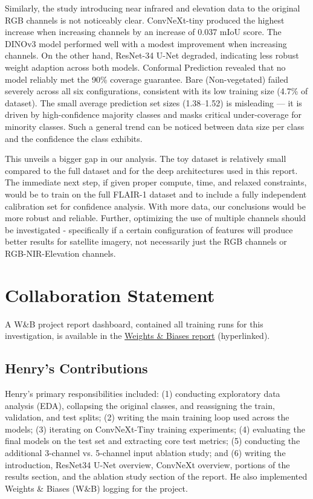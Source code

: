 \documentclass{article}
\begin{document}
Similarly, the study introducing near infrared and elevation data to the original RGB channels is not noticeably clear. ConvNeXt-tiny produced the highest increase when increasing channels by an increase of 0.037 mIoU score. The DINOv3 model performed well with a modest improvement when increasing channels. On the other hand, ResNet-34 U-Net degraded, indicating less robust weight adaption across both models. Conformal Prediction revealed that no model reliably met the 90\% coverage guarantee. Bare (Non-vegetated) failed severely across all six configurations, consistent with its low training size (4.7\% of dataset). The small average prediction set sizes (1.38–1.52) is misleading — it is driven by high-confidence majority classes and masks critical under-coverage for minority classes. Such a general trend can be noticed between data size per class and the confidence the class exhibits. 

This unveils a bigger gap in our analysis. The toy dataset is relatively small compared to the full dataset and for the deep architectures used in this report. The immediate next step, if given proper compute, time, and relaxed constraints, would be to train on the full FLAIR-1 dataset and to include a fully independent calibration set for confidence analysis. With more data, our conclusions would be more robust and reliable. Further, optimizing the use of multiple channels should be investigated - specifically if a certain configuration of features will produce better results for satellite imagery, not necessarily just the RGB channels or RGB-NIR-Elevation channels.

\section*{Collaboration Statement}

A W\&B project report dashboard, contained all training runs for this investigation, is available in the
\href{https://api.wandb.ai/links/flair-segmentation-dle/xepqbnmw}{Weights \& Biases report} (hyperlinked).

\subsection{Henry's Contributions}
Henry's primary responsibilities included: (1) conducting exploratory data analysis (EDA), collapsing the original classes, and reassigning the train, validation, and test splits; (2) writing the main training loop used across the models; (3) iterating on ConvNeXt-Tiny training experiments; (4) evaluating the final models on the test set and extracting core test metrics; (5) conducting the additional 3-channel vs. 5-channel input ablation study; and (6) writing the introduction, ResNet34 U-Net overview, ConvNeXt overview, portions of the results section, and the ablation study section of the report. He also implemented Weights \& Biases (W\&B) logging for the project.
\end{document}

